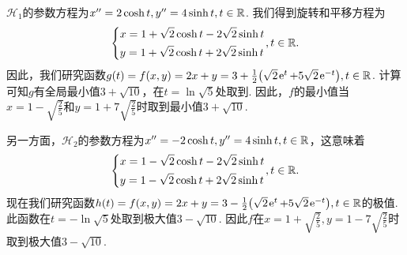 \begin{solution}
\begin{inparaenum}[(a)]
       $\mathscr H_1$的参数方程为$x''=2\cosh t,y''=4\sinh t,t\in\mathbb R$. 我们得到旋转和平移方程为
       \[
         \left\{
           \begin{aligned}
             & x = 1 + \sqrt2\cosh t - 2\sqrt2\sinh t \\
             & y = 1 + \sqrt2\cosh t + 2\sqrt2\sinh t
           \end{aligned}
         \right., t\in\MR.
       \]
    因此，我们研究函数$g(t)=f(x,y)=2x+y=3+\frac12\left(\sqrt2\ee^t+
    5\sqrt2\ee^{-t}\right),t\in\MR$. 计算可知$g$有全局最小值$3+\sqrt{10}$，在$t=\ln\sqrt5$处取到. 因此，$f$的最小值当$x=1-\sqrt{\frac25}$和$y=1+7\sqrt{\frac25}$时取到最小值$3+\sqrt{10}$.

    另一方面，$\mathscr H_2$的参数方程为$x''=-2\cosh t,y''=4\sinh t,t\in\mathbb R$，这意味着
    \[
      \left\{
        \begin{aligned}
          & x = 1 - \sqrt2\cosh t - 2\sqrt2\sinh t \\
          & y = 1 - \sqrt2\cosh t + 2\sqrt2\sinh t
        \end{aligned}
      \right.,t\in\MR.
    \]
    现在我们研究函数$h(t)=f(x,y)=2x+y=3-\frac12\left(\sqrt2\ee^t+
    5\sqrt2\ee^{-t}\right),t\in\MR$的极值. 此函数在$t=-\ln\sqrt5$处取到极大值$3-\sqrt{10}$. 因此$f$在$x=1+\sqrt{\frac25},y=1-7\sqrt{\frac25}$时取到极大值$3-\sqrt{10}$.


\end{inparaenum}
\end{solution}
